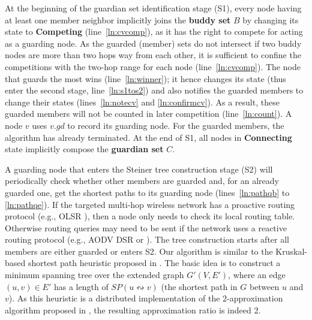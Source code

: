 \documentclass[10pt, conference, compsocconf]{IEEEtran}
\begin{document}
    At the beginning of the guardian set identification stage (S1), every node having at least one member neighbor implicitly joins the \textbf{buddy set} $B$ by changing its state to \textbf{Competing} (line~\ref{ln:cvcomp}), as it has the right to compete for acting as a guarding node. As the guarded (member) sets do not intersect if two buddy nodes are more than two hops way from each other, it is sufficient to confine the competitions with the two-hop range for each node (line~\ref{ln:cvcomp}). The node that guards the most wins (line~\ref{ln:winner}); it hence changes its state (thus enter the second stage, line~\ref{ln:s1tos2}) and also notifies the guarded members to change their states (lines~\ref{ln:notecv} and \ref{ln:confirmcv}). As a result, these guarded members will not be counted in later competition (line~\ref{ln:count}). A node $v$ uses $v.\mathit{gd}$ to record its guarding node. For the guarded members, the algorithm has already terminated. At the end of S1, all nodes in \textbf{Connecting} state implicitly compose the \textbf{guardian set} $C$.

    A guarding node that enters the Steiner tree construction stage (S2) will periodically check whether other members are guarded and, for an already guarded one, get the shortest paths to its guarding node (lines~\ref{ln:pathqb} to \ref{ln:pathqe}). If the targeted multi-hop wireless network has a proactive routing protocol (e.g., OLSR \cite{OSLR}), then a node only needs to check its local routing table. Otherwise routing queries may need to be sent if the network uses a reactive routing protocol (e.g., AODV \cite{AODV} DSR or \cite{DSR}). The tree construction starts after all members are either guarded or enters S2. Our algorithm is similar to the Kruskal-based shortest path heuristic proposed in \cite{Bauer1996}. The basic idea is to construct a minimum spanning tree over the extended graph $G'(V, E')$, where an edge $(u,v) \in E'$ has a length of $\mathit{SP}(u \leftrightsquigarrow v)$ (the shortest path in $G$ between $u$ and $v$). As this heuristic is a distributed implementation of the 2-approximation algorithm proposed in \cite{Kou1981}, the resulting approximation ratio is indeed 2.
\end{document}

